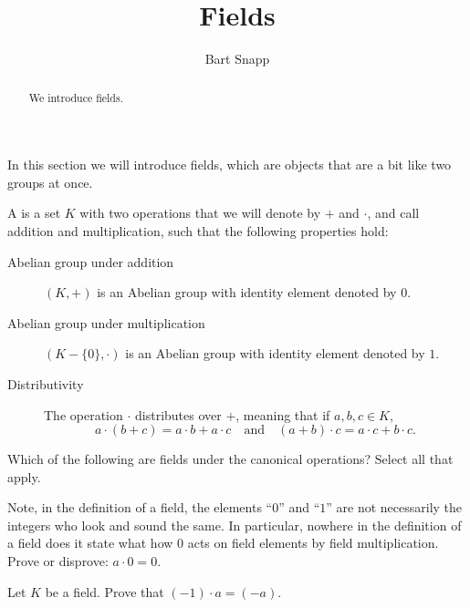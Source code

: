 \documentclass{ximera}
\author{Bart Snapp}
\title{Fields}
\begin{document}
\begin{abstract}
  We introduce fields.
\end{abstract}
\maketitle

In this section we will introduce fields, which are objects that are a
bit like two groups at once.


\begin{definition}
  A  is a set $K$ with two operations that we will denote
  by $+$ and $\cdot$, and call addition and multiplication, such that
  the following properties hold:
  \begin{description}
  \item[Abelian group under addition] $(K,+)$ is an Abelian
    group with identity element denoted by $0$.
  \item[Abelian group under multiplication] $(K-\{0\},\cdot)$ is
    an Abelian group with identity element denoted by $1$.
  \item[Distributivity] The operation $\cdot$ distributes over $+$,
    meaning that if $a,b,c\in K$,
    \[
    a\cdot (b+ c) = a\cdot b+ a\cdot c \quad\text{and}\quad (a+ b)\cdot c  = a\cdot c+ b\cdot c.
    \]
  \end{description}
\end{definition}

\begin{exercise} 
  Which of the following are fields under the canonical operations?
  Select all that apply.
  \begin{selectAll}
    \choice[correct]{$\Q$}
    \choice[correct]{$\R$}
    \choice[correct]{$\C$}
    \choice{$\Z$}
  \end{selectAll}
\end{exercise}




\begin{exercise}
  Note, in the definition of a field, the elements ``$0$'' and ``$1$''
  are not necessarily the integers who look and sound the same. In
  particular, nowhere in the definition of a field does it state what
  how $0$ acts on field elements by field multiplication. Prove or
  disprove: $a\cdot 0 = 0$.
\end{exercise}

\begin{exercise}
  Let $K$ be a field. Prove that $(-1)\cdot a = (-a)$.
\end{exercise}
\end{document}
